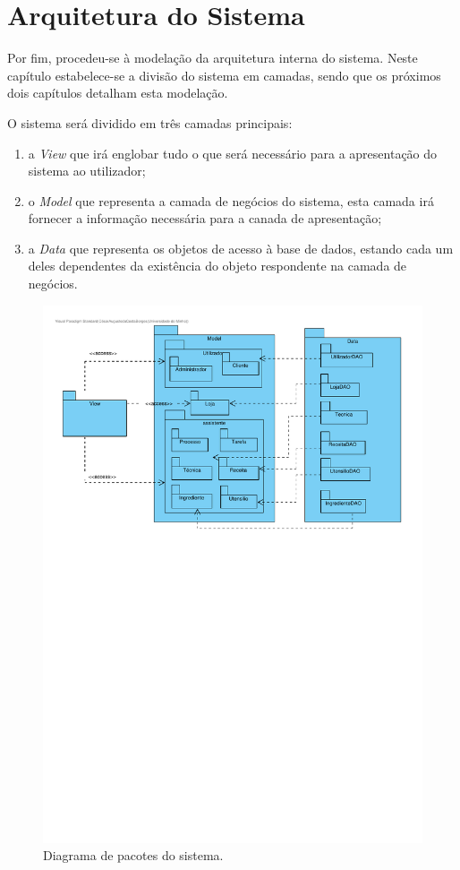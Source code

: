 
\section{Arquitetura do Sistema}

Por fim, procedeu-se à modelação da arquitetura interna do sistema. Neste capítulo estabelece-se a divisão do sistema em camadas, sendo que os próximos dois capítulos detalham esta modelação.

\label{cap:arquitetura}
O sistema será dividido em três camadas principais:
\begin{enumerate}
    \item a \emph{View} que irá englobar tudo o que será necessário para a apresentação do sistema ao utilizador;
    \item o \emph{Model} que representa a camada de negócios do sistema, esta camada irá fornecer a informação necessária para a canada de apresentação;
    \item a \emph{Data} que representa os objetos de acesso à base de dados, estando cada um deles dependentes da existência do objeto respondente na camada de negócios.
\end{enumerate}

\begin{figure}[ht]
  \centering 
  \includegraphics[width = \textwidth]{figures/08/diagrama-Pacotes.pdf}
  \caption{Diagrama de pacotes do sistema.}
  \label{fig:arquitetura:DiagramaPacotes}
\end{figure}

